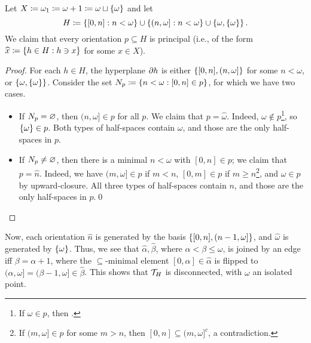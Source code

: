\documentclass{amsart}
\begin{document}
    \begin{example}[Tserunyan]\label{line}
        Let $X\coloneqq\omega_1\coloneqq\omega+1\coloneqq\omega\sqcup\l\{\omega\r\}$ and let
        \begin{equation*}
            H\coloneqq\l\{[0,n]\st n<\omega\r\}\cup\l\{(n,\omega]\st n<\omega\r\}\cup\l\{\omega,\l\{\omega\r\}\r\}.
        \end{equation*}
        We claim that every orientation $p\subseteq H$ is principal (i.e., of the form $\widehat{x}\coloneqq\l\{h\in H\st h\ni x\r\}$ for some $x\in X$).
        \begin{center}
            \begin{minipage}{0.9\textwidth}
                \begin{proof}
                    For each $h\in H$, the hyperplane $\del h$ is either $\l\{[0,n],(n,\omega]\r\}$ for some $n<\omega$, or $\l\{\omega,\l\{\omega\r\}\r\}$. Consider the set $N_p\coloneqq\l\{n<\omega\st[0,n]\in p\r\}$, for which we have two cases.
                    \begin{itemize}
                        \item If $N_p=\em$, then $(n,\omega]\in p$ for all $p$. We claim that $p=\widehat{\omega}$. Indeed, $\omega\not\in p$\footnote{If $\omega\in p$, then {\color{red}{???}}.}, so $\l\{\omega\r\}\in p$. Both types of half-spaces contain $\omega$, and those are the only half-spaces in $p$.
                        \item If $N_p\neq\em$, then there is a minimal $n<\omega$ with $[0,n]\in p$; we claim that $p=\widehat{n}$. Indeed, we have $(m,\omega]\in p$ if $m<n$, $[0,m]\in p$ if $m\geq n$\footnote{If $(m,\omega]\in p$ for some $m>n$, then $[0,n]\subseteq(m,\omega]^c$, a contradiction.}, and $\omega\in p$ by upward-closure. All three types of half-spaces contain $n$, and those are the only half-spaces in $p$.\qed
                    \end{itemize}
                \end{proof}
            \end{minipage}
        \end{center}
        Now, each orientation $\widehat{n}$ is generated by the basis $\l\{[0,n],(n-1,\omega]\r\}$, and $\widehat{\omega}$ is generated by $\l\{\omega\r\}$. Thus, we see that $\widehat{\alpha},\widehat{\beta}$, where $\alpha<\beta\leq\omega$, is joined by an edge iff $\beta=\alpha+1$, where the $\subseteq$-minimal element $[0,\alpha]\in\widehat{\alpha}$ is flipped to $(\alpha,\omega]=(\beta-1,\omega]\in\widehat{\beta}$. This shows that $\mc{T}_H$ is disconnected, with $\omega$ an isolated point.
    \end{example}
\end{document}
